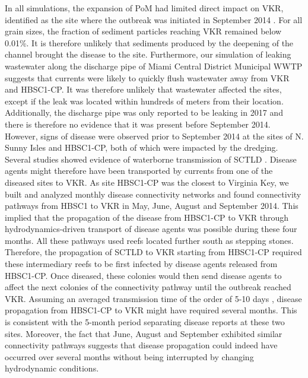 \documentclass[preprint,12pt,authoryear]{elsarticle}
\begin{document}
In all simulations, the expansion of PoM had limited direct impact on VKR, identified as the site where the outbreak was initiated in September 2014 \citep{precht2016unprecedented}. For all grain sizes, the fraction of sediment particles reaching VKR remained below 0.01\%. It is therefore unlikely that sediments produced by the deepening of the channel brought the disease to the site. Furthermore, our simulation of leaking wastewater along the discharge pipe of Miami Central District Municipal WWTP suggests that currents were likely to quickly flush wastewater away from VKR and HBSC1-CP. It was therefore unlikely that wastewater affected the sites, except if the leak was located within hundreds of meters from their location. Additionally, the discharge pipe was only reported to be leaking in 2017 \citep{staletovich2017} and there is therefore no evidence that it was present before September 2014. However, signs of disease were observed prior to September 2014 at the sites of N. Sunny Isles and HBSC1-CP, both of which were impacted by the dredging. Several studies showed evidence of waterborne transmission of SCTLD \citep{aeby2019pathogenesis,dobbelaere2020coupled,eaton2021measuring,meiling2021variable}. Disease agents might therefore have been transported by currents from one of the diseased sites to VKR. As site HBSC1-CP was the closest to Virginia Key, we built and analyzed monthly disease connectivity networks and found connectivity pathways from HBSC1 to VKR in May, June, August and September 2014. This implied that the propagation of the disease from HBSC1-CP to VKR through hydrodynamics-driven transport of disease agents was possible during these four months. All these pathways used reefs located further south as stepping stones. Therefore, the propagation of SCTLD to VKR starting from HBSC1-CP required these intermediary reefs to be first infected by disease agents released from HBSC1-CP. Once diseased, these colonies would then send disease agents to affect the next colonies of the connectivity pathway until the outbreak reached VKR. Assuming an averaged transmission time of the order of 5-10 days \citep{dobbelaere2020coupled}, disease propagation from HBSC1-CP to VKR might have required several months. This is consistent with the 5-month period separating disease reports at these two sites. Moreover, the fact that June, August and September exhibited similar connectivity pathways suggests that disease propagation could indeed have occurred over several months without being interrupted by changing hydrodynamic conditions.
\end{document}
